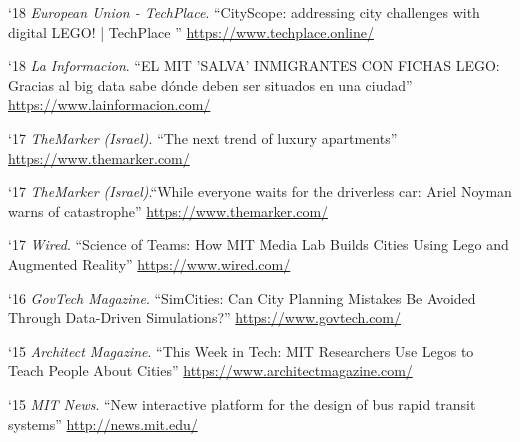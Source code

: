 \begin{tablist}
    \item[`18] \tab \textit{European Union - TechPlace}. \enquote{CityScope: addressing city challenges with digital LEGO! | TechPlace }
    \href{https://www.techplace.online/cityscope-addressing-city-challenges-with-digital-lego/}{https://www.techplace.online/}

    \item[`18] \tab \textit{La Informacion}. \enquote{EL MIT 'SALVA' INMIGRANTES CON FICHAS LEGO: Gracias al big data sabe dónde deben ser situados en una ciudad} \href{https://www.lainformacion.com/tecnologia/el-mit-salva-inmigrantes-con-fichas-lego-gracias-al-big-data-sabe-donde-deben-ser-situados-en-una-ciudad/6351916/}{https://www.lainformacion.com/}

    \item[`17] \tab \textit{TheMarker (Israel)}. \enquote{The next trend of luxury apartments}
    \href{https://www.themarker.com/realestate/1.4456551}{https://www.themarker.com/}

    \item[`17] \tab \textit{TheMarker (Israel)}.\enquote{While everyone waits for the driverless car: Ariel Noyman warns of catastrophe}
    \href{https://www.themarker.com/markerweek/1.4008478}{https://www.themarker.com/}

    \item[`17] \tab \textit{Wired}. \enquote{Science of Teams: How MIT Media Lab Builds Cities Using Lego and Augmented Reality}
    \href{https://www.wired.com/video/watch/science-of-teams-mit-media-lab}{https://www.wired.com/}

    \item[`16] \tab \textit{GovTech Magazine}. \enquote{SimCities: Can City Planning Mistakes Be Avoided Through Data-Driven Simulations?}
    \href{https://www.govtech.com/data/SimCities-Can-City-Planning-Mistakes-Be-Avoided-Through-Data-Driven-Simulations.html}{https://www.govtech.com/}

    \item[`15] \tab \textit{Architect Magazine}. \enquote{This Week in Tech: MIT Researchers Use Legos to Teach People About Cities}
    \href{https://www.architectmagazine.com/technology/this-week-in-tech-mit-researchers-use-legos-to-teach-people-about-cities_o}{https://www.architectmagazine.com/}

    \item[`15] \tab \textit{MIT News}. \enquote{New interactive platform for the design of bus rapid transit systems}
    \href{http://news.mit.edu/2015/interactive-platform-design-bus-rapid-transit-brt-systems-1007}{http://news.mit.edu/}


\end{tablist}
